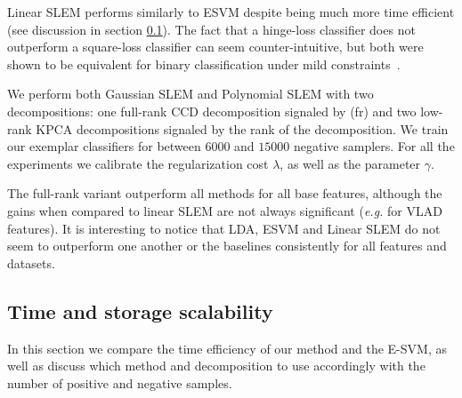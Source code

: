 Linear SLEM performs similarly to ESVM despite being much more time efficient (see discussion in section \ref{time-scale}). 
The fact that a hinge-loss classifier does not outperform a square-loss classifier can seem counter-intuitive, but both were shown to be equivalent for binary classification under mild constraints~\cite{YeXi07}.

We perform both Gaussian SLEM and Polynomial SLEM with two decompositions: one full-rank CCD decomposition signaled by (fr) and two low-rank KPCA decompositions signaled by the rank of the decomposition. We train our exemplar classifiers for between $6000$ and $15000$ negative samplers. For all the experiments we calibrate the regularization cost $\lambda$, as well as the parameter $\gamma$. 

The full-rank variant outperform all methods for all base features, although the gains when compared to linear SLEM are not always significant (\emph{e.g.} for VLAD features). It is interesting to notice that LDA, ESVM and Linear SLEM do not seem to outperform one another or the baselines consistently for all features and datasets.








\subsection{Time and storage scalability} \label{time-scale}
In this section we compare the time efficiency of our method and the E-SVM, as well as discuss which method and decomposition to use accordingly with the number of positive and negative samples.

